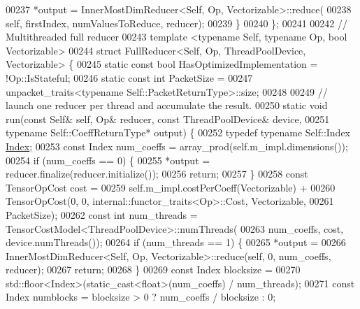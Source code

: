 \begin{DoxyCode}
00237     *output = InnerMostDimReducer<Self, Op, Vectorizable>::reduce(
00238         \textcolor{keyword}{self}, firstIndex, numValuesToReduce, reducer);
00239   \}
00240 \};
00241 
00242 \textcolor{comment}{// Multithreaded full reducer}
00243 \textcolor{keyword}{template} <\textcolor{keyword}{typename} Self, \textcolor{keyword}{typename} Op, \textcolor{keywordtype}{bool} Vectorizable>
00244 \textcolor{keyword}{struct }FullReducer<Self, Op, ThreadPoolDevice, Vectorizable> \{
00245   \textcolor{keyword}{static} \textcolor{keyword}{const} \textcolor{keywordtype}{bool} HasOptimizedImplementation = !Op::IsStateful;
00246   \textcolor{keyword}{static} \textcolor{keyword}{const} \textcolor{keywordtype}{int} PacketSize =
00247       unpacket\_traits<typename Self::PacketReturnType>::size;
00248 
00249   \textcolor{comment}{// launch one reducer per thread and accumulate the result.}
00250   \textcolor{keyword}{static} \textcolor{keywordtype}{void} run(\textcolor{keyword}{const} Self& \textcolor{keyword}{self}, Op& reducer, \textcolor{keyword}{const} ThreadPoolDevice& device,
00251                   \textcolor{keyword}{typename} Self::CoeffReturnType* output) \{
00252     \textcolor{keyword}{typedef} \textcolor{keyword}{typename} Self::Index \hyperlink{namespace_eigen_a62e77e0933482dafde8fe197d9a2cfde}{Index};
00253     \textcolor{keyword}{const} Index num\_coeffs = array\_prod(\textcolor{keyword}{self}.m\_impl.dimensions());
00254     \textcolor{keywordflow}{if} (num\_coeffs == 0) \{
00255       *output = reducer.finalize(reducer.initialize());
00256       \textcolor{keywordflow}{return};
00257     \}
00258     \textcolor{keyword}{const} TensorOpCost cost =
00259         \textcolor{keyword}{self}.m\_impl.costPerCoeff(Vectorizable) +
00260         TensorOpCost(0, 0, internal::functor\_traits<Op>::Cost, Vectorizable,
00261                      PacketSize);
00262     \textcolor{keyword}{const} \textcolor{keywordtype}{int} num\_threads = TensorCostModel<ThreadPoolDevice>::numThreads(
00263         num\_coeffs, cost, device.numThreads());
00264     \textcolor{keywordflow}{if} (num\_threads == 1) \{
00265       *output =
00266           InnerMostDimReducer<Self, Op, Vectorizable>::reduce(\textcolor{keyword}{self}, 0, num\_coeffs, reducer);
00267       \textcolor{keywordflow}{return};
00268     \}
00269     \textcolor{keyword}{const} Index blocksize =
00270         std::floor<Index>(\textcolor{keyword}{static\_cast<}\textcolor{keywordtype}{float}\textcolor{keyword}{>}(num\_coeffs) / num\_threads);
00271     \textcolor{keyword}{const} Index numblocks = blocksize > 0 ? num\_coeffs / blocksize : 0;

\end{DoxyCode}
